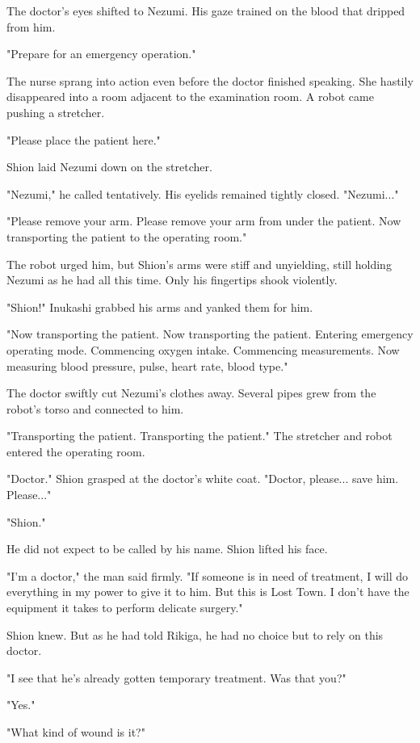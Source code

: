 The doctor's eyes shifted to Nezumi. His gaze trained on the blood that
dripped from him.

"Prepare for an emergency operation."

The nurse sprang into action even before the doctor finished speaking.
She hastily disappeared into a room adjacent to the examination room. A
robot came pushing a stretcher.

{\sffamily "Please place the patient here."}

Shion laid Nezumi down on the stretcher.

"Nezumi," he called tentatively. His eyelids remained tightly closed.
"Nezumi..."

{\sffamily "Please remove your arm. Please remove your arm from under the patient.
Now transporting the patient to the operating room."}

The robot urged him, but Shion's arms were stiff and unyielding, still
holding Nezumi as he had all this time. Only his fingertips shook
violently.

"Shion!" Inukashi grabbed his arms and yanked them for him.

{\sffamily "Now transporting the patient. Now transporting the patient. Entering
	emergency operating mode. Commencing oxygen intake. Commencing
	measurements. Now measuring blood pressure, pulse, heart rate, blood
	type."}

The doctor swiftly cut Nezumi's clothes away. Several pipes grew from
the robot's torso and connected to him.

{\sffamily "Transporting the patient. Transporting the patient."} The stretcher and
robot entered the operating room.

"Doctor." Shion grasped at the doctor's white coat. "Doctor, please...
save him. Please..."

"Shion."

He did not expect to be called by his name. Shion lifted his face.

"I'm a doctor," the man said firmly. "If someone is in need of
treatment, I will do everything in my power to give it to him. But this
is Lost Town. I don't have the equipment it takes to perform delicate
surgery."

Shion knew. But as he had told Rikiga, he had no choice but to rely on
this doctor.

"I see that he's already gotten temporary treatment. Was that you?"

"Yes."

"What kind of wound is it?"

